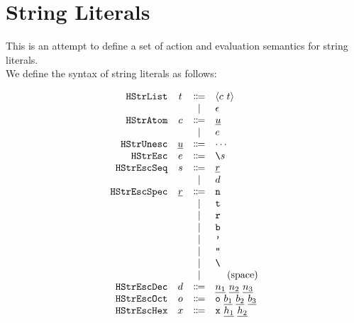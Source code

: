 \documentclass[12pt]{article}
\begin{document}
\section{String Literals}
This is an attempt to define a set of action and evaluation semantics for string literals. \\

\noindent We define the syntax of string literals as follows:
%
\begin{center}
  \vspace*{-1.5em}
  \[\begin{array}{rccl}
    \texttt{HStrList}    & t    & \Coloneqq & \langle c~t \rangle \\
                &                 & \mid         & \epsilon                            \\
    \texttt{HStrAtom}    & c    & \Coloneqq & \underline{u}                         \\
                &                 & \mid         & e                           \\
    \texttt{HStrUnesc}   & \underline{u}   & \Coloneqq & \cdots                                     \\
    \texttt{HStrEsc}     & e     & \Coloneqq & \texttt{\textbackslash}s              \\
    \texttt{HStrEscSeq}  & s  & \Coloneqq & \underline{r}                       \\
                &                 & \mid         & d                        \\
    \texttt{HStrEscSpec} & \underline{r} & \Coloneqq & \texttt{n}                                     \\
                &                 & \mid         & \texttt{t}                                     \\
                &                 & \mid         & \texttt{r}                                     \\
                &                 & \mid         & \texttt{b}                                     \\
                &                 & \mid         & \texttt{'}                                     \\
                &                 & \mid         & \texttt{"}                                     \\
                &                 & \mid         & \texttt{\textbackslash}                        \\
                &                 & \mid         & \texttt{ }~~\text{(space)}                            \\ 
    \texttt{HStrEscDec}  & d  & \Coloneqq & \underline{n_{1}}~\underline{n_{2}}~\underline{n_{3}}                          \\
    \texttt{HStrEscOct}  & o  & \Coloneqq & \texttt{o}~\underline{b_{1}}~\underline{b_{2}}~\underline{b_{3}}                          \\
    \texttt{HStrEscHex}  & x  & \Coloneqq & \texttt{x}~\underline{h_{1}}~\underline{h_{2}}                          \\
  \end{array}\]
\end{center}
\end{document}
